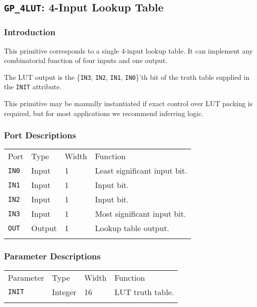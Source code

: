 \documentclass[11pt]{article}
\newcommand{\tokenstyle}[1]{\texttt{#1}}
\newcommand{\whenstyle}[1]{{\fontseries{sb}\selectfont#1}}
\newcommand{\thinhline}{\Xhline{1\arrayrulewidth}}
\newcommand{\thickhline}{\Xhline{2.5\arrayrulewidth}}
\begin{document}

\pagebreak
\subsection{\tokenstyle{GP\_4LUT}: 4-Input Lookup Table}
\label{gp-4lut}

\subsubsection{Introduction}
This primitive corresponds to a single 4-input lookup table. It can implement any combinatorial function of four
inputs and one output.

The LUT output is the \{\tokenstyle{IN3}, \tokenstyle{IN2}, \tokenstyle{IN1}, \tokenstyle{IN0}\}'th bit of the truth table supplied in the \tokenstyle{INIT} attribute.

This primitive may be manually instantiated if exact control over LUT packing is required, but for most applications we
recommend inferring logic.

\subsubsection{Port Descriptions}

\begin{tabularx}{\textwidth}{lllX}
\thinhline
\whenstyle{Port} & \whenstyle{Type} & \whenstyle{Width} & \whenstyle{Function} \\
\thickhline
\tokenstyle{IN0} & Input & 1 & Least significant input bit. \\
\thinhline
\tokenstyle{IN1} & Input & 1 & Input bit. \\
\thinhline
\tokenstyle{IN2} & Input & 1 & Input bit. \\
\thinhline
\tokenstyle{IN3} & Input & 1 & Most significant input bit. \\
\thinhline
\tokenstyle{OUT} & Output & 1 & Lookup table output. \\
\thinhline
\end{tabularx}

\subsubsection{Parameter Descriptions}

\begin{tabularx}{\textwidth}{lllX}
\thinhline
\whenstyle{Parameter} & \whenstyle{Type} & \whenstyle{Width} & \whenstyle{Function} \\
\thickhline
\tokenstyle{INIT} & Integer & 16 & LUT truth table. \\
\thinhline
\end{tabularx}
\end{document}
